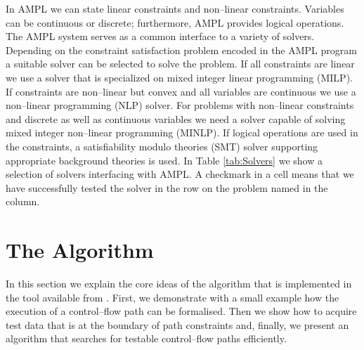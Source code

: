 \documentclass[runningheads,a4paper]{llncs}%
\begin{document}
In AMPL we can state linear constraints and non--linear constraints. Variables can be continuous or discrete; furthermore, AMPL provides logical operations. The AMPL system serves as a common interface to a variety of solvers. Depending on the constraint satisfaction problem encoded in the AMPL program a suitable solver can be selected to solve the problem. If all constraints are linear we use a solver that is specialized on mixed integer linear programming (MILP). If constraints are non--linear but convex and all variables are continuous we use a non--linear programming (NLP) solver. For problems with non--linear constraints and discrete as well as continuous variables we need a solver capable of solving mixed integer non--linear programming (MINLP). If logical operations are used in the constraints, a satisfiability modulo theories (SMT) solver supporting appropriate background theories is used. In Table \ref{tab:Solvers} we show a selection of solvers interfacing with AMPL. A checkmark in a cell means that we have successfully tested the solver in the row on the problem named in the column.%
\section{The Algorithm}%
\label{sec:Algorithm}%
In this section we explain the core ideas of the algorithm that is implemented in the tool available from \cite{PartegWebsite}. First, we demonstrate with a small example how the execution of a control--flow path can be formalised. Then we show how to acquire test data that is at the boundary of path constraints and, finally, we present an algorithm that searches for testable control--flow paths efficiently.%
\end{document}
